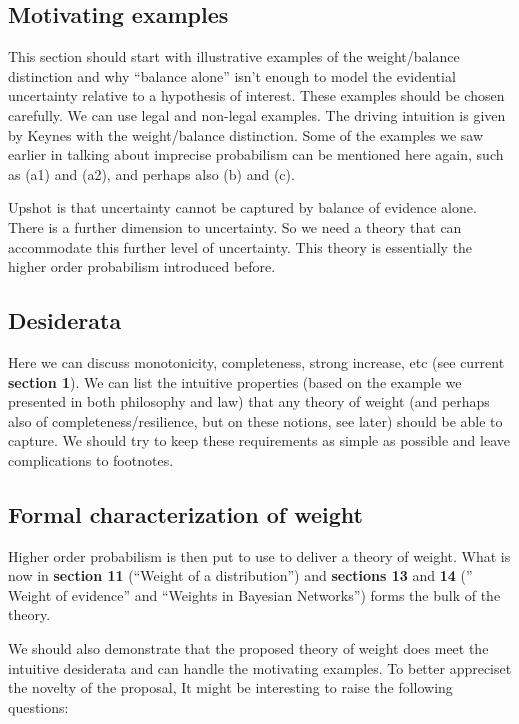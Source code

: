 \documentclass[
  10pt,
  dvipsnames,enabledeprecatedfontcommands]{scrartcl}
\begin{document}
\hypertarget{motivating-examples}{%
\subsection{Motivating examples}\label{motivating-examples}}

This section should start with illustrative examples of the
weight/balance distinction and why ``balance alone'' isn't enough to
model the evidential uncertainty relative to a hypothesis of interest.
These examples should be chosen carefully. We can use legal and
non-legal examples. The driving intuition is given by Keynes with the
weight/balance distinction. Some of the examples we saw earlier in
talking about imprecise probabilism can be mentioned here again, such as
(a1) and (a2), and perhaps also (b) and (c).

Upshot is that uncertainty cannot be captured by balance of evidence
alone. There is a further dimension to uncertainty. So we need a theory
that can accommodate this further level of uncertainty. This theory is
essentially the higher order probabilism introduced before.

\hypertarget{desiderata}{%
\subsection{Desiderata}\label{desiderata}}

Here we can discuss monotonicity, completeness, strong increase, etc
(see current \textbf{section 1}). We can list the intuitive properties
(based on the example we presented in both philosophy and law) that any
theory of weight (and perhaps also of completeness/resilience, but on
these notions, see later) should be able to capture. We should try to
keep these requirements as simple as possible and leave complications to
footnotes.

\hypertarget{formal-characterization-of-weight}{%
\subsection{Formal characterization of
weight}\label{formal-characterization-of-weight}}

Higher order probabilism is then put to use to deliver a theory of
weight. What is now in \textbf{section 11} (``Weight of a
distribution'') and \textbf{sections 13} and \textbf{14} ('' Weight of
evidence'' and ``Weights in Bayesian Networks'') forms the bulk of the
theory.

We should also demonstrate that the proposed theory of weight does meet
the intuitive desiderata and can handle the motivating examples. To
better appreciset the novelty of the proposal, It might be interesting
to raise the following questions:
\end{document}
